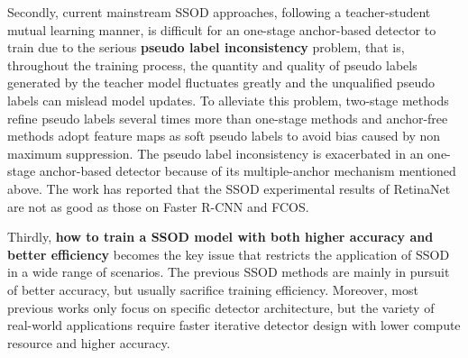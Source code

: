 \documentclass[10pt,twocolumn,letterpaper]{article}
\begin{document}
Secondly, current mainstream SSOD approaches, following a teacher-student mutual learning manner\cite{liu2021unbiased,xu2021end}, is difficult for an one-stage anchor-based detector to train due to the serious \textbf{pseudo label inconsistency} problem, that is, throughout the training process, the quantity and quality of pseudo labels generated by the teacher model fluctuates greatly and the unqualified pseudo labels can mislead model updates.
To alleviate this problem, two-stage methods\cite{chen2022label}\cite{liu2021unbiased} refine pseudo labels several times more than one-stage methods 
and anchor-free methods\cite{zhou2022dense} adopt feature maps as soft pseudo labels to avoid bias caused by non maximum suppression.
The pseudo label inconsistency is exacerbated in an one-stage anchor-based detector because of its multiple-anchor mechanism mentioned above.  
The work\cite{zhang2022s4od} has reported that the SSOD experimental results of RetinaNet are not as good as those on Faster R-CNN and FCOS.





Thirdly,\textbf{ how to train a SSOD model with both higher accuracy and better efficiency} becomes the key issue that restricts the application of SSOD in a wide range of scenarios. The previous SSOD methods\cite{xu2021end, liu2021unbiased,chen2022label,zhou2021instant,li2022pseco} are mainly in pursuit of better accuracy, but usually sacrifice training efficiency. Moreover, most previous works only focus on specific detector architecture, but the variety of real-world applications require faster iterative detector design with lower compute resource and higher accuracy. 
\end{document}
